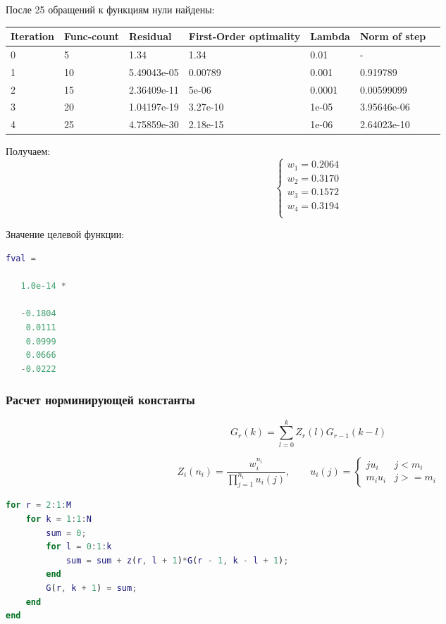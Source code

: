 \documentclass[14pt,a4paper,report]{report}
\begin{document}
После 25 обращений к функциям нули найдены:

\begin{tabular}{  | l | l | l | l | l | l | l |}

     \hline
      Iteration & Func-count & Residual & First-Order optimality & Lambda & Norm of  step\\ \hline
0 & 5 & 1.34  & 1.34          & 0.01& -\\ \hline
1 & 10 & 5.49043e-05 & 0.00789     &   0.001     &  0.919789\\ \hline
2 & 15 & 2.36409e-11  & 5e-06  &  0.0001    & 0.00599099 \\ \hline
3 & 20 & 1.04197e-19 &  3.27e-10    &   1e-05   & 3.95646e-06 \\ \hline
4 & 25 & 4.75859e-30 & 2.18e-15     &  1e-06   & 2.64023e-10 \\ \hline
\end{tabular}

Получаем:
$$
\begin{cases}
w_1= 0.2064\\
w_2=0.3170\\
w_3=0.1572\\
w_4=0.3194\\
\end{cases}
$$

Значение целевой функции:
\begin{lstlisting}[language={matlab},  basicstyle=\ttfamily]
fval =

   1.0e-14 *

   -0.1804
    0.0111
    0.0999
    0.0666
   -0.0222
\end{lstlisting}
\subsubsection{Расчет норминирующей константы}

$$ G_r(k) = \sum_{l=0}^k Z_r(l) G_{r-1}(k-l)  $$

$$ Z_i(n_i) = \frac{w_i^{n_i}}{\prod\limits_{j= 1}^{n_i} u_i(j)} , \qquad
u_i(j)= \begin{cases}
   j u_i & {j<m_i}\\
   m_i u_i & {j>=m_i}
 \end{cases}  $$

\begin{lstlisting}[language={matlab}, caption={Cкрипт для расчета норминирующей константы},  basicstyle=\ttfamily]
for r = 2:1:M
    for k = 1:1:N
        sum = 0;
        for l = 0:1:k
            sum = sum + z(r, l + 1)*G(r - 1, k - l + 1);
        end
        G(r, k + 1) = sum;
    end
end
\end{lstlisting}
\end{document}
